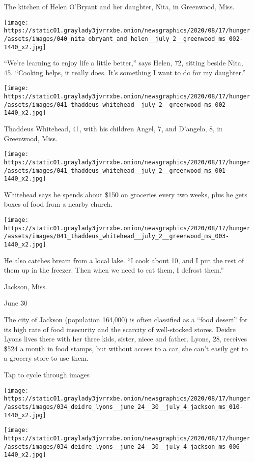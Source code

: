 The kitchen of Helen O'Bryant and her daughter, Nita, in Greenwood,
Miss.

\texttt{[image: https://static01.graylady3jvrrxbe.onion/newsgraphics/2020/08/17/hunger/assets/images/040\_nita\_obryant\_and\_helen\_\_july\_2\_\_greenwood\_ms\_002-1440\_x2.jpg]}

``We're learning to enjoy life a little better,'' says Helen, 72,
sitting beside Nita, 45. ``Cooking helps, it really does. It's something
I want to do for my daughter.''

\texttt{[image: https://static01.graylady3jvrrxbe.onion/newsgraphics/2020/08/17/hunger/assets/images/041\_thaddeus\_whitehead\_\_july\_2\_\_greenwood\_ms\_002-1440\_x2.jpg]}

Thaddeus Whitehead, 41, with his children Angel, 7, and D'angelo, 8, in
Greenwood, Miss.

\texttt{[image: https://static01.graylady3jvrrxbe.onion/newsgraphics/2020/08/17/hunger/assets/images/041\_thaddeus\_whitehead\_\_july\_2\_\_greenwood\_ms\_001-1440\_x2.jpg]}

Whitehead says he spends about \$150 on groceries every two weeks, plus
he gets boxes of food from a nearby church.

\texttt{[image: https://static01.graylady3jvrrxbe.onion/newsgraphics/2020/08/17/hunger/assets/images/041\_thaddeus\_whitehead\_\_july\_2\_\_greenwood\_ms\_003-1440\_x2.jpg]}

He also catches bream from a local lake. ``I cook about 10, and I put
the rest of them up in the freezer. Then when we need to eat them, I
defrost them.''

Jackson, Miss.

June 30

The city of Jackson (population 164,000) is often classified as a ``food
desert'' for its high rate of food insecurity and the scarcity of
well-stocked stores. Deidre Lyons lives there with her three kids,
sister, niece and father. Lyons, 28, receives \$524 a month in food
stamps, but without access to a car, she can't easily get to a grocery
store to use them.

Tap to cycle through images

\texttt{[image: https://static01.graylady3jvrrxbe.onion/newsgraphics/2020/08/17/hunger/assets/images/034\_deidre\_lyons\_\_june\_24\_\_30\_\_july\_4\_jackson\_ms\_010-1440\_x2.jpg]}

\texttt{[image: https://static01.graylady3jvrrxbe.onion/newsgraphics/2020/08/17/hunger/assets/images/034\_deidre\_lyons\_\_june\_24\_\_30\_\_july\_4\_jackson\_ms\_006-1440\_x2.jpg]}

